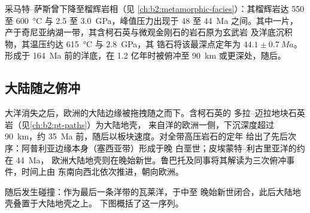 采马特–萨斯曾下降至榴辉岩相（见
\cref{ch:b2:metamorphic-facies}）：其榴辉岩达 550 至 \qty{600}{\celsius} 与 2.5 至
\qty{3.0}{GPa}，峰值压力出现于 48 至 \qty{44}{Ma} 之间。其中一片，
产于奇尼亚纳湖一带，其含柯石英与微观金刚石的岩石原为玄武岩
及洋底沉积物，其温压约达 \qty{615}{\celsius} 与 \qty{2.8}{GPa}，其
锆石将该最深点定年为 $44.1 \pm \qty{0.7}{Ma}$。形成于
\qty{164}{Ma} 前的洋底，在 1.2 亿年时被俯冲至
\qty{90}{km} 或更深处，随后。

\subsection*{大陆随之俯冲}

大洋消失之后，欧洲的大陆边缘被拖拽随之而下。含柯石英的
多拉–迈拉地块石英岩（见\cref{ch:b2:pt-paths}）为大陆地壳，
来自洋的欧洲一侧，下沉深度超过 \qty{90}{km}，约
\qty{35}{Ma} 前，随后以板块速度。对全带高压岩石的定年
给出了先后次序：阿普利亚边缘本身（塞西亚带）形成于晚
白垩世；皮埃蒙特–利古里亚洋的约在 \qty{44}{Ma}，
欧洲大陆地壳则在晚始新世。鲁巴托及同事将其解读为三次俯冲事件，时间上由
东南向西北依次推进，朝向欧洲。

随后发生碰撞：作为最后一条洋带的瓦莱洋，于中至
晚始新世闭合，此后大陆地壳叠置于大陆地壳之上。
下图概括了这一序列。


